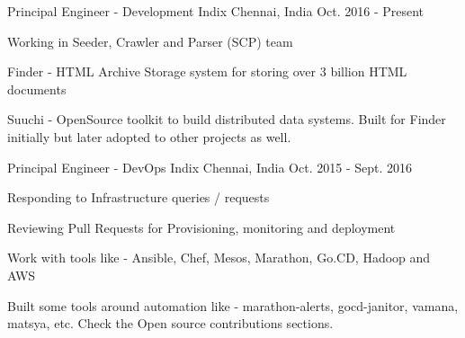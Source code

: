 

\begin{cventries}

  \cventry
    {Principal Engineer - Development} %
    {Indix} %
    {Chennai, India} %
    {Oct. 2016 - Present} %
    {
      \begin{cvitems} %
        \item {Working in Seeder, Crawler and Parser (SCP) team}
        \item {Finder - HTML Archive Storage system for storing over 3 billion HTML documents}
        \item {Suuchi - OpenSource toolkit to build distributed data systems. Built for Finder initially but later adopted to other projects as well.}
      \end{cvitems}
    }

  \cventry
    {Principal Engineer - DevOps} %
    {Indix} %
    {Chennai, India} %
    {Oct. 2015 - Sept. 2016} %
    {
      \begin{cvitems} %
        \item {Responding to Infrastructure queries / requests}
        \item {Reviewing Pull Requests for Provisioning, monitoring and deployment}
        \item {Work with tools like - Ansible, Chef, Mesos, Marathon, Go.CD, Hadoop and AWS}
        \item {Built some tools around automation like - marathon-alerts, gocd-janitor, vamana, matsya, etc.
        Check the Open source contributions sections. }
      \end{cvitems}
    }


\end{cventries}
